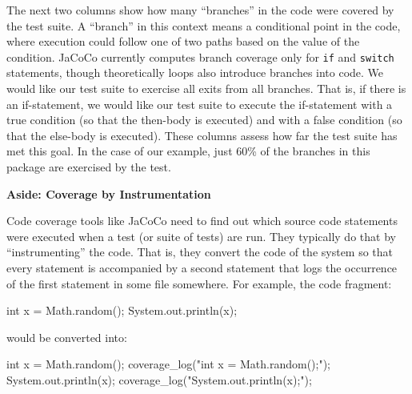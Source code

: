 \documentclass[
]{book}
\newenvironment{Shaded}{\begin{snugshade}}{\end{snugshade}}
\newcommand{\BuiltInTok}[1]{#1}
\newcommand{\DataTypeTok}[1]{\textcolor[rgb]{0.13,0.29,0.53}{#1}}
\newcommand{\FunctionTok}[1]{\textcolor[rgb]{0.00,0.00,0.00}{#1}}
\newcommand{\NormalTok}[1]{#1}
\newcommand{\StringTok}[1]{\textcolor[rgb]{0.31,0.60,0.02}{#1}}
\begin{document}
The next two columns show how many ``branches'' in the code were covered by the test suite. A ``branch'' in this context means a conditional point in the code, where execution could follow one of two paths based on the value of the condition. JaCoCo currently computes branch coverage only for \texttt{if} and \texttt{switch} statements, though theoretically loops also introduce branches into code. We would like our test suite to exercise all exits from all branches. That is, if there is an if-statement, we would like our test suite to execute the if-statement with a true condition (so that the then-body is executed) and with a false condition (so that the else-body is executed). These columns assess how far the test suite has met this goal. In the case of our example, just 60\% of the branches in this package are exercised by the test.

\textbf{Aside: Coverage by Instrumentation}

Code coverage tools like JaCoCo need to find out which source code statements were executed when a test (or suite of tests) are run. They typically do that by ``instrumenting'' the code. That is, they convert the code of the system so that every statement is accompanied by a second statement that logs the occurrence of the first statement in some file somewhere. For example, the code fragment:

\begin{Shaded}
\begin{Highlighting}[]
\DataTypeTok{int}\NormalTok{ x = }\BuiltInTok{Math}\NormalTok{.}\FunctionTok{random}\NormalTok{();}
\BuiltInTok{System}\NormalTok{.}\FunctionTok{out}\NormalTok{.}\FunctionTok{println}\NormalTok{(x);}
\end{Highlighting}
\end{Shaded}

would be converted into:

\begin{Shaded}
\begin{Highlighting}[]
\DataTypeTok{int}\NormalTok{ x = }\BuiltInTok{Math}\NormalTok{.}\FunctionTok{random}\NormalTok{();}
\FunctionTok{coverage\_log}\NormalTok{(}\StringTok{"int x = Math.random();"}\NormalTok{);}
\BuiltInTok{System}\NormalTok{.}\FunctionTok{out}\NormalTok{.}\FunctionTok{println}\NormalTok{(x);}
\FunctionTok{coverage\_log}\NormalTok{(}\StringTok{"System.out.println(x);"}\NormalTok{);}
\end{Highlighting}
\end{Shaded}
\end{document}
